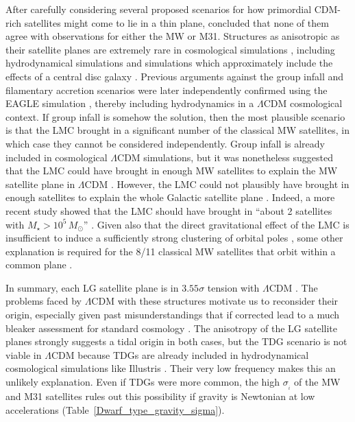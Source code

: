\documentclass[fleqn,usenatbib,useAMS,onecolumn]{mnras} %
\begin{document}
After carefully considering several proposed scenarios for how primordial CDM-rich satellites might come to lie in a thin plane, \citet{Pawlowski_2014} concluded that none of them agree with observations for either the MW or M31. Structures as anisotropic as their satellite planes are extremely rare in cosmological simulations \citep{Ibata_2014, Pawlowski_2014_paired_halos}, including hydrodynamical simulations \citep{Ahmed_2017, Shao_2019, Pawlowski_2020} and simulations which approximately include the effects of a central disc galaxy \citep{Pawlowski_2019}. Previous arguments against the group infall and filamentary accretion scenarios \citep{Metz_2009, Pawlowski_2014} were later independently confirmed \citep{Shao_2018} using the EAGLE simulation \citep{Crain_2015, Schaye_2015}, thereby including hydrodynamics in a $\Lambda$CDM cosmological context. If group infall is somehow the solution, then the most plausible scenario is that the LMC brought in a significant number of the classical MW satellites, in which case they cannot be considered independently. Group infall is already included in cosmological $\Lambda$CDM simulations, but it was nonetheless suggested that the LMC could have brought in enough MW satellites to explain the MW satellite plane in $\Lambda$CDM \citep{Samuel_2021}. However, the LMC could not plausibly have brought in enough satellites to explain the whole Galactic satellite plane \citep{Nichols_2011}. Indeed, a more recent study showed that the LMC should have brought in ``about 2 satellites with $M_{\star} > 10^5 \, M_\odot$'' \citep{Isabel_2021}. Given also that the direct gravitational effect of the LMC is insufficient to induce a sufficiently strong clustering of orbital poles \citep{Garavito_2021, Correa_2022, Pawlowski_2022}, some other explanation is required for the 8/11 classical MW satellites that orbit within a common plane \citep{Pawlowski_2020}.

In summary, each LG satellite plane is in $3.55\sigma$ tension with $\Lambda$CDM \citep[table~3 of][]{Banik_2021_backsplash}. The problems faced by $\Lambda$CDM with these structures motivate us to reconsider their origin, especially given past misunderstandings that if corrected lead to a much bleaker assessment for standard cosmology \citep{Pawlowski_2021_Nature}. The anisotropy of the LG satellite planes strongly suggests a tidal origin in both cases, but the TDG scenario is not viable in $\Lambda$CDM because TDGs are already included in hydrodynamical cosmological simulations like Illustris \citep{Haslbauer_2019}. Their very low frequency makes this an unlikely explanation. Even if TDGs were more common, the high $\sigma_{_i}$ of the MW and M31 satellites rules out this possibility if gravity is Newtonian at low accelerations (Table~\ref{Dwarf_type_gravity_sigma}).
\end{document}
